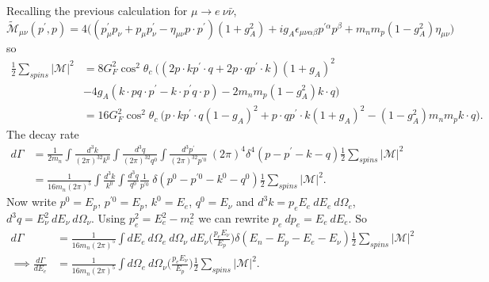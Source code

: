\documentclass[a4paper,12pt]{article}
\begin{document}
Recalling the previous calculation for $\mu \to e\ \nu \bar{\nu}$, 
\begin{equation}
\tilde{\mathcal{M}}_{\mu\nu}(p^\prime,p) = 4\bigg((p_\mu^\prime p_\nu + p_\mu p_\nu^\prime - \eta_{\mu\nu} p \cdot p^\prime)(1+g_A^2) + i g_A \epsilon_{\mu\nu\alpha\beta}p^{\prime \alpha}p^\beta + m_n m_p(1-g_A^2)\eta_{\mu\nu}\bigg)
\end{equation}
so
\begin{equation}
\begin{split}
\frac{1}{2}\sum_{spins}|\mathcal{M}|^2 &= 8 G_F^2\cos^2\theta_c\ \bigg((2p\cdot k p^\prime \cdot q + 2 p\cdot q p^\prime \cdot k)(1+g_A)^2 \\
&- 4g_A(k\cdot p q\cdot p^\prime - k\cdot p^\prime q\cdot p) - 2 m_n m_p(1-g_A^2)k \cdot q\bigg)\\
&= 16G_F^2\cos^2\theta_c\ \bigg(p\cdot k p^\prime \cdot q (1-g_A)^2 + p\cdot q p^\prime \cdot k (1+ g_A)^2 - (1-g_A^2)m_n m_p k \cdot q \bigg).
\end{split}
\end{equation}
The decay rate
\begin{equation}
\begin{split}
d\Gamma &= \frac{1}{2m_n} \int\frac{d^3k}{(2\pi)^32k^0} \int\frac{d^3q}{(2\pi)^32q^0} \int\frac{d^3p^\prime}{(2\pi)^32p^{\prime 0}}\ (2\pi)^4 \delta^4(p - p^\prime -k - q)\frac{1}{2}\sum_{spins}|\mathcal{M}|^2 \\
&= \frac{1}{16m_n(2\pi)^5}\int\frac{d^3k}{k^0} \int\frac{d^3q}{q^0}\frac{1}{p^{\prime 0}}\ \delta(p^0 - p^{\prime 0} - k^0 - q^0) \frac{1}{2}\sum_{spins}|\mathcal{M}|^2.
\end{split}
\end{equation}
Now write $p^0 = E_p$, $p^{\prime 0} = E_p$, $k^0 = E_e$, $q^0 = E_\nu$ and $d^3k = p_e E_e\ dE_e\ d\Omega_e$, $d^3q = E_\nu^2\ dE_\nu\ d\Omega_\nu$. Using $p_e^2 = E_e^2 - m_e^2$ we can rewrite $p_e\ dp_e = E_e\ dE_e$. So
\begin{equation}
\begin{split}
    d\Gamma &= \frac{1}{16m_n(2\pi)^5}\int dE_e\ d\Omega_e\ d\Omega_\nu\ dE_\nu \bigg(\frac{p_e E_\nu}{E_p}\bigg) \delta(E_n - E_p -E_e - E_\nu) \frac{1}{2}\sum_{spins}|\mathcal{M}|^2 \\
  \implies  \frac{d\Gamma}{dE_e} &= \frac{1}{16m_n(2\pi)^5}\int d\Omega_e\ d\Omega_\nu \bigg(\frac{p_e E_\nu}{E_p}\bigg)\frac{1}{2}\sum_{spins}|\mathcal{M}|^2.\\
\end{split}
\end{equation}
\end{document}
